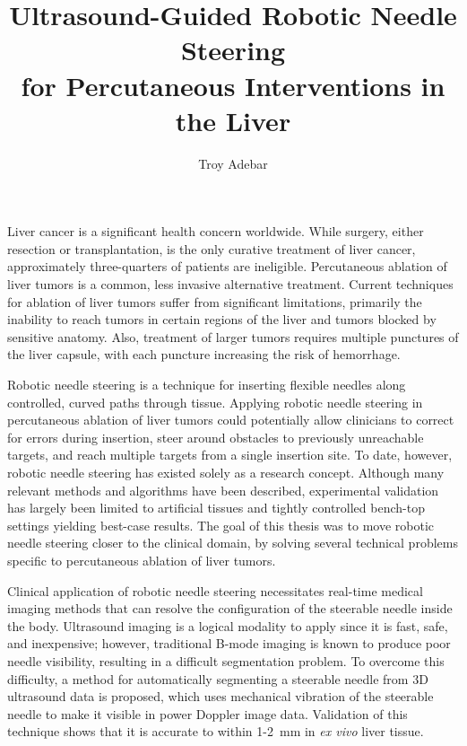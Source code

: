\documentclass[12pt,twoside]{report}
\begin{document}
\renewcommand{\thepage}{\roman{page}}%

\title{Ultrasound-Guided Robotic Needle Steering\\
            for Percutaneous Interventions in the Liver}
\author{Troy Adebar}
 
\beforepreface
Liver cancer is a significant health concern worldwide. While surgery, either resection or transplantation, is the only curative treatment of liver cancer, approximately three-quarters of patients are ineligible. Percutaneous ablation of liver tumors is a common, less invasive alternative treatment. Current techniques for ablation of liver tumors suffer from significant limitations, primarily the inability to reach tumors in certain regions of the liver and tumors blocked by sensitive anatomy. Also, treatment of larger tumors requires multiple punctures of the liver capsule, with each puncture increasing the risk of hemorrhage.

Robotic needle steering is a technique for inserting flexible needles along controlled, curved paths through tissue. Applying robotic needle steering in percutaneous ablation of liver tumors could potentially allow clinicians to correct for errors during insertion, steer around obstacles to previously unreachable targets, and reach multiple targets from a single insertion site. To date, however, robotic needle steering has existed solely as a research concept. Although many relevant methods and algorithms have been described, experimental validation has largely been limited to artificial tissues and tightly controlled bench-top settings yielding best-case results. The goal of this thesis was to move robotic needle steering closer to the clinical domain, by solving several technical problems specific to percutaneous ablation of liver tumors.

Clinical application of robotic needle steering necessitates real-time medical imaging methods that can resolve the configuration of the steerable needle inside the body. Ultrasound imaging is a logical modality to apply since it is fast, safe, and inexpensive; however, traditional B-mode imaging is known to produce poor needle visibility, resulting in a difficult segmentation problem. To overcome this difficulty, a method for automatically segmenting a steerable needle from 3D ultrasound data is proposed, which uses mechanical vibration of the steerable needle to make it visible in power Doppler image data. Validation of this technique shows that it is accurate to within 1-2~mm in \textit{ex vivo} liver tissue.
\end{document}
